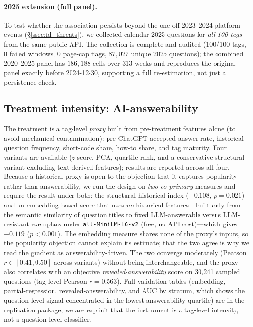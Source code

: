 \paragraph{2025 extension (full panel).}
To test whether the association persists beyond the one-off
2023--2024 platform events (\S\ref{ssec:id_threats}), we
collected calendar-2025 questions for \emph{all 100 tags} from
the same public API. The collection is complete and audited
(100/100 tags, 0 failed windows, 0 page-cap flags, $87{,}027$
unique 2025 questions); the combined 2020--2025 panel has
$186{,}188$ cells over 313 weeks and reproduces the original
panel exactly before 2024-12-30, supporting a full
re-estimation, not just a persistence check.

\subsection{Treatment intensity: AI-answerability}
\label{ssec:data_ai_answerability}

The treatment is a tag-level \emph{proxy} built from
pre-treatment features alone (to avoid mechanical contamination):
pre-ChatGPT accepted-answer rate, historical question frequency,
short-code share, how-to share, and tag maturity. Four variants
are available ($z$-score, PCA, quartile rank, and a conservative
structural variant excluding text-derived features); results are
reported across all four. Because a historical proxy is open to
the objection that it captures popularity rather than
answerability, we run the design on \emph{two co-primary}
measures and require the result under both: the structural
historical index ($-0.108$, $p=0.021$) and an embedding-based
score that uses \emph{no} historical features---built only from
the semantic similarity of question titles to fixed
LLM-answerable versus LLM-resistant exemplars under
\texttt{all-MiniLM-L6-v2} (free, no API cost)---which gives
$-0.119$ ($p<0.001$). The embedding measure shares none of the
proxy's inputs, so the popularity objection cannot explain its
estimate; that the two agree is why we read the gradient as
answerability-driven. The two converge moderately (Pearson
$r\in[0.41,0.50]$ across variants) without being
interchangeable, and the proxy also correlates with an objective
\emph{revealed-answerability} score on 30{,}241 sampled questions
(tag-level Pearson $r=0.563$). Full validation tables (embedding,
partial-regression, revealed-answerability, and AUC by stratum,
which shows the question-level signal concentrated in the
lowest-answerability quartile) are in the replication package; we
are explicit that the instrument is a tag-level intensity, not a
question-level classifier.

